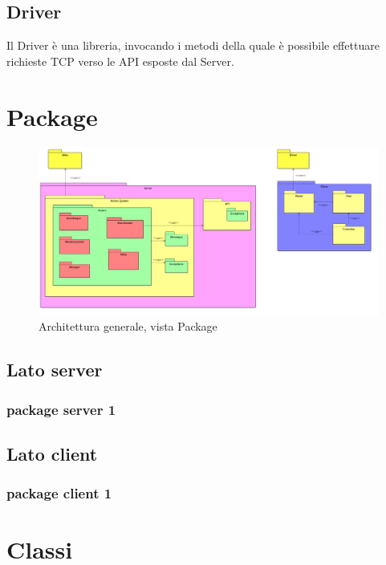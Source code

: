 \documentclass[a4paper]{article}
\begin{document}
        \subsection{Driver}
        	Il Driver è una libreria, invocando i metodi della quale è possibile effettuare richieste TCP verso le API esposte dal Server.
    
	\newpage 
	\section{Package}
		\begin{figure} [H]
			\centering
			\includegraphics[scale=0.3]{Packages_generale.png}
			\caption{Architettura generale, vista Package}
		\end{figure}
	
		\subsection{Lato server}
			\subsubsection{package server 1}
				
		\subsection{Lato client}
			\subsubsection{package client 1}
	\newpage 
	\section{Classi}
\end{document}
